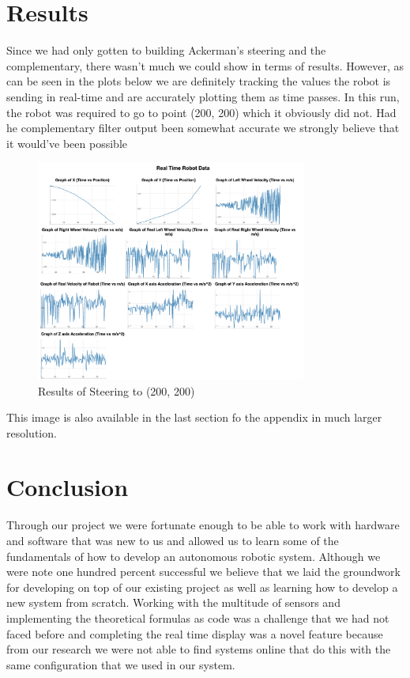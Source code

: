 \documentclass[conference]{IEEEtran}
\begin{document}
    \section{Results}

    Since we had only gotten to building Ackerman’s steering and the complementary,
    there wasn’t much we could show in terms of results. However, as can be seen in
    the plots below we are definitely tracking the values the robot is sending in
    real-time and are accurately plotting them as time passes. In this run, the
    robot was required to go to point (200, 200) which it obviously did not. Had 
    he complementary filter output been somewhat accurate we strongly believe that
    it would’ve been possible

    \begin{figure}[H]
        \centering
        \captionsetup{justification=centering}
        \centering
        \includegraphics[width=3.5in]{14.jpg}
        \caption{Results of Steering to (200, 200)}  
        \label{6}
    \end{figure}

    This image is also available in the last section fo the appendix in much larger resolution.
    \section{Conclusion}

    Through our project we were fortunate enough to be able to work with hardware and software
    that was new to us and allowed us to learn some of the fundamentals of how to develop an
    autonomous robotic system. Although we were note one hundred percent successful we believe
    that we laid the groundwork for developing on top of our existing project as well
    as learning how to develop a new system from scratch. Working with the multitude of sensors
    and implementing the theoretical formulas as code was a challenge that we had not faced before
    and completing the real time display was a novel feature because from our research we were
    not able to find systems online that do this with the same configuration that we used in our
    system. 
\end{document}

